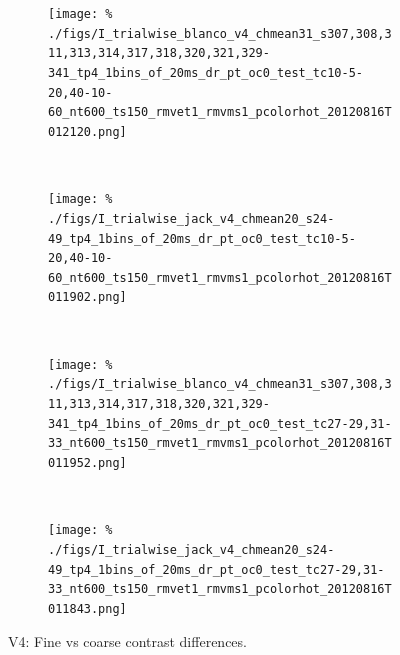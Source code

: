 
\begin{figure}[htbp]
    \begin{subfigure}[b]{0.5\linewidth}
        \centering
        \caption{\small{}}
        \label{fig:b4-1x20cc}
        \texttt{[image: \%
./figs/I\_trialwise\_blanco\_v4\_chmean31\_s307,308,311,313,314,317,318,320,321,329-341\_tp4\_1bins\_of\_20ms\_dr\_pt\_oc0\_test\_tc10-5-20,40-10-60\_nt600\_ts150\_rmvet1\_rmvms1\_pcolorhot\_20120816T012120.png]}
    \end{subfigure}
    ~~
    \begin{subfigure}[b]{0.5\linewidth}
        \centering
        \caption{\small{}}
        \label{fig:j4-1x20cc}
        \texttt{[image: \%
./figs/I\_trialwise\_jack\_v4\_chmean20\_s24-49\_tp4\_1bins\_of\_20ms\_dr\_pt\_oc0\_test\_tc10-5-20,40-10-60\_nt600\_ts150\_rmvet1\_rmvms1\_pcolorhot\_20120816T011902.png]}
    \end{subfigure}
    \\
    \begin{subfigure}[b]{0.5\linewidth}
        \centering
        \caption{\small{}}
        \label{fig:b4-1x20fc}
        \texttt{[image: \%
./figs/I\_trialwise\_blanco\_v4\_chmean31\_s307,308,311,313,314,317,318,320,321,329-341\_tp4\_1bins\_of\_20ms\_dr\_pt\_oc0\_test\_tc27-29,31-33\_nt600\_ts150\_rmvet1\_rmvms1\_pcolorhot\_20120816T011952.png]}
    \end{subfigure}
    ~~
    \begin{subfigure}[b]{0.5\linewidth}
        \centering
        \caption{\small{}}
        \label{fig:j4-1x20fc}
        \texttt{[image: \%
./figs/I\_trialwise\_jack\_v4\_chmean20\_s24-49\_tp4\_1bins\_of\_20ms\_dr\_pt\_oc0\_test\_tc27-29,31-33\_nt600\_ts150\_rmvet1\_rmvms1\_pcolorhot\_20120816T011843.png]}
    \end{subfigure}
    \caption{\small{}V4: Fine vs coarse contrast differences.
}
\end{figure}
